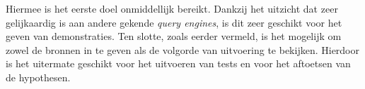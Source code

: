 Hiermee is het eerste doel onmiddellijk bereikt. Dankzij het uitzicht dat zeer gelijkaardig is aan andere gekende \textit{query engines}, is dit zeer geschikt voor het geven van demonstraties. Ten slotte, zoals eerder vermeld, is het mogelijk om zowel de bronnen in te geven als de volgorde van uitvoering te bekijken. Hierdoor is het uitermate geschikt voor het uitvoeren van tests en voor het aftoetsen van de hypothesen.